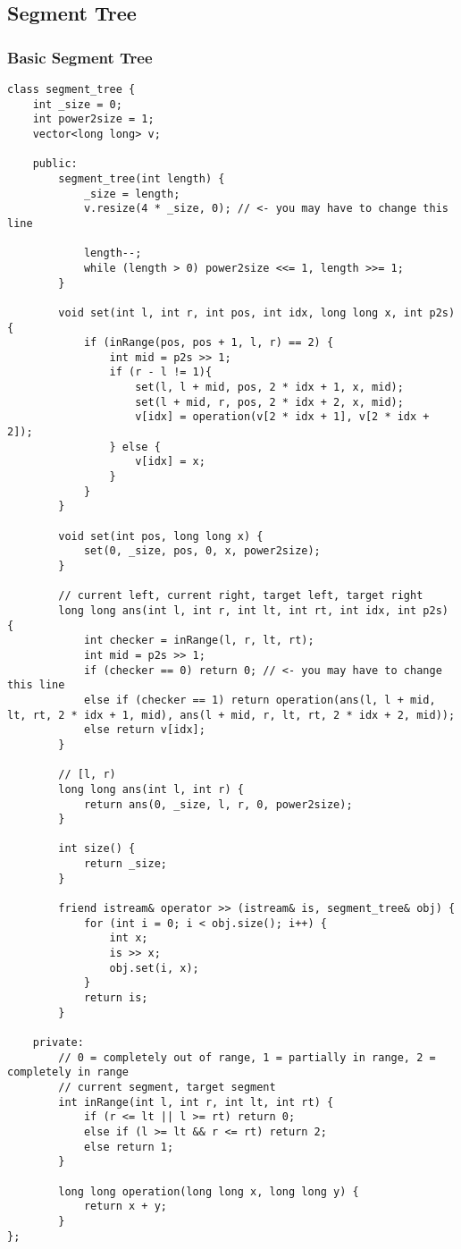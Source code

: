 \subsection{Segment Tree}
\subsubsection{Basic Segment Tree}
\begin{lstlisting}
class segment_tree {
    int _size = 0;
    int power2size = 1;
    vector<long long> v;

    public:
        segment_tree(int length) {
            _size = length;
            v.resize(4 * _size, 0); // <- you may have to change this line

            length--;
            while (length > 0) power2size <<= 1, length >>= 1;
        }

        void set(int l, int r, int pos, int idx, long long x, int p2s) {
            if (inRange(pos, pos + 1, l, r) == 2) {
                int mid = p2s >> 1;
                if (r - l != 1){
                    set(l, l + mid, pos, 2 * idx + 1, x, mid);
                    set(l + mid, r, pos, 2 * idx + 2, x, mid);
                    v[idx] = operation(v[2 * idx + 1], v[2 * idx + 2]);
                } else {
                    v[idx] = x;
                }
            }
        }

        void set(int pos, long long x) {
            set(0, _size, pos, 0, x, power2size);
        }

        // current left, current right, target left, target right
        long long ans(int l, int r, int lt, int rt, int idx, int p2s) {
            int checker = inRange(l, r, lt, rt);
            int mid = p2s >> 1;
            if (checker == 0) return 0; // <- you may have to change this line
            else if (checker == 1) return operation(ans(l, l + mid, lt, rt, 2 * idx + 1, mid), ans(l + mid, r, lt, rt, 2 * idx + 2, mid));
            else return v[idx];
        }

        // [l, r)
        long long ans(int l, int r) {
            return ans(0, _size, l, r, 0, power2size);
        }
        
        int size() {
            return _size;
        }
        
        friend istream& operator >> (istream& is, segment_tree& obj) {
            for (int i = 0; i < obj.size(); i++) {
                int x;
                is >> x;
                obj.set(i, x);
            }
            return is;
        }

    private:
        // 0 = completely out of range, 1 = partially in range, 2 = completely in range
        // current segment, target segment
        int inRange(int l, int r, int lt, int rt) {
            if (r <= lt || l >= rt) return 0;
            else if (l >= lt && r <= rt) return 2;
            else return 1;
        }

        long long operation(long long x, long long y) {
            return x + y;
        }
};
\end{lstlisting}

